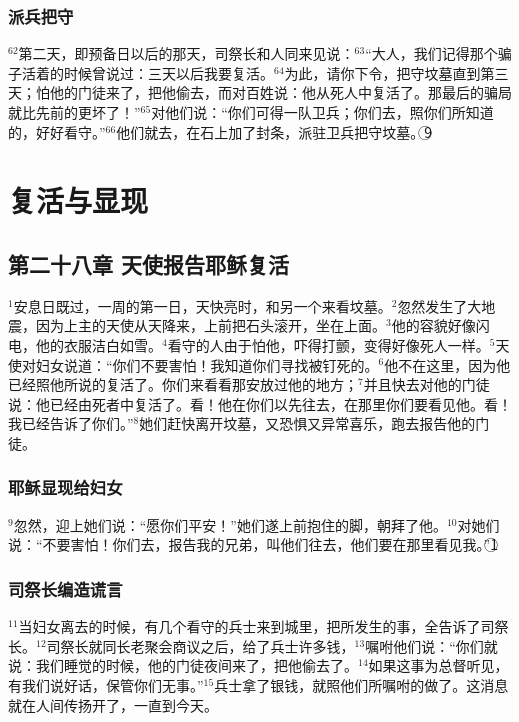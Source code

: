 \subsubsection{派兵把守}
$^{62}$第二天，即预备日以后的那天，司祭长和\UL[法利塞]人同来见\UL[比拉多]说：$^{63}$“大人，我们记得那个骗子活着的时候曾说过：三天以后我要复活。$^{64}$为此，请你下令，把守坟墓直到第三天；怕他的门徒来了，把他偷去，而对百姓说：他从死人中复活了。那最后的骗局就比先前的更坏了！”$^{65}$\UL[比拉多]对他们说：“你们可得一队卫兵；你们去，照你们所知道的，好好看守。”$^{66}$他们就去，在石上加了封条，派驻卫兵把守坟墓。\textcircled{9}


\section{复活与显现}


\subsection{第二十八章 天使报告耶稣复活}
$^{1}$安息日既过，一周的第一日，天快亮时，\UL[玛利亚]\UL[玛达肋纳]和另一个\UL[玛利亚]来看坟墓。$^{2}$忽然发生了大地震，因为上主的天使从天降来，上前把石头滚开，坐在上面。$^{3}$他的容貌好像闪电，他的衣服洁白如雪。$^{4}$看守的人由于怕他，吓得打颤，变得好像死人一样。$^{5}$天使对妇女说道：“你们不要害怕！我知道你们寻找被钉死的\UL[耶稣]。$^{6}$他不在这里，因为他已经照他所说的复活了。你们来看看那安放过他的地方；$^{7}$并且快去对他的门徒说：他已经由死者中复活了。看！他在你们以先往\UL[加里肋亚]去，在那里你们要看见他。看！我已经告诉了你们。”$^{8}$她们赶快离开坟墓，又恐惧又异常喜乐，跑去报告他的门徒。


\subsubsection{耶稣显现给妇女}
$^{9}$忽然，\UL[耶稣]迎上她们说：“愿你们平安！”她们遂上前抱住\UL[耶稣]的脚，朝拜了他。$^{10}$\UL[耶稣]对她们说：“不要害怕！你们去，报告我的兄弟，叫他们往\UL[加里肋亚]去，他们要在那里看见我。”\textcircled{1}


\subsubsection{司祭长编造谎言}
$^{11}$当妇女离去的时候，有几个看守的兵士来到城里，把所发生的事，全告诉了司祭长。$^{12}$司祭长就同长老聚会商议之后，给了兵士许多钱，$^{13}$嘱咐他们说：“你们就说：我们睡觉的时候，他的门徒夜间来了，把他偷去了。$^{14}$如果这事为总督听见，有我们说好话，保管你们无事。”$^{15}$兵士拿了银钱，就照他们所嘱咐的做了。这消息就在\UL[犹太]人间传扬开了，一直到今天。


